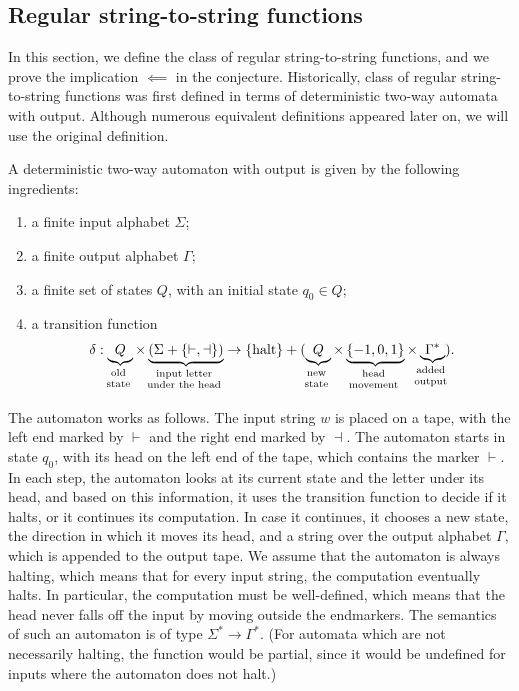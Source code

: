 
\subsection{Regular string-to-string functions}
\label{sec:regular-string-to-string-functions}

In this section, we define the class of regular string-to-string functions, and we prove the implication $\impliedby$ in the conjecture. 
 Historically, class of regular string-to-string  functions was first defined in terms of 
 deterministic two-way automata with output\cite[Note 4]{shepherdson1959reduction}. Although numerous equivalent definitions appeared later on, we will use the original definition.

 \begin{definition}
    A deterministic two-way automaton with output is given by the following ingredients:
    \begin{enumerate}
        \item a finite input alphabet $\Sigma$;
        \item a finite output alphabet $\Gamma$;
        \item a finite set of states $Q$, with an initial state $q_0 \in Q$;
        \item a transition function  
        \begin{align*}
        \delta : 
        \myunderbrace{Q}{old \\ state} \times 
        \myunderbrace{(\Sigma + \{\vdash, \dashv\})}{input letter\\ under  the head} \to  \set{\text{halt}} + (
        \myunderbrace{Q}{new \\ state}
         \times 
         \myunderbrace{\{-1,0,1\}}{head \\ movement} \times 
         \myunderbrace{\Gamma^*}{added \\ output}) .
        \end{align*}
    \end{enumerate}
 \end{definition}

    The automaton works as follows. The input string $w$ is placed on a tape, with the left end marked by $\vdash$ and the right end marked by $\dashv$. The automaton starts in state $q_0$, with its head on the left end of the tape, which contains the marker $\vdash$. In each step, the automaton looks at its current state and the letter under its head, and based on this information, it uses the transition function to decide if it halts, or it continues its computation. In case it continues, it chooses a  new state, the direction in which it moves its head, and a string over the output alphabet $\Gamma$, which is appended to the output tape. We assume that the automaton is always halting, which means that for every input string, the computation eventually halts. In particular, the computation must be well-defined, which means that the head never falls off the input by moving outside the endmarkers.   The semantics of such an automaton is of type $\Sigma^* \to \Gamma^*$. (For automata which are not necessarily halting, the function would be partial, since it would be undefined for inputs where the automaton does not halt.)

